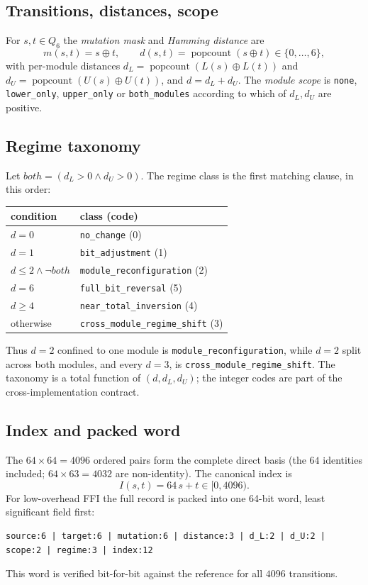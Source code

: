 \documentclass[11pt,a4paper]{article}
\begin{document}
\subsection{Transitions, distances, scope}
For $s,t\in Q_6$ the \emph{mutation mask} and \emph{Hamming distance} are
\begin{equation}
m(s,t) = s\oplus t, \qquad d(s,t) = \operatorname{popcount}(s\oplus t)\in\{0,\dots,6\},
\end{equation}
with per-module distances $d_L = \operatorname{popcount}(L(s)\oplus L(t))$ and
$d_U = \operatorname{popcount}(U(s)\oplus U(t))$, and $d = d_L + d_U$. The
\emph{module scope} is \texttt{none}, \texttt{lower\_only}, \texttt{upper\_only} or
\texttt{both\_modules} according to which of $d_L,d_U$ are positive.

\subsection{Regime taxonomy}
Let $\mathit{both} = (d_L>0 \wedge d_U>0)$. The regime class is the first matching
clause, in this order:
\begin{center}
\begin{tabular}{ll}
\toprule
condition & class (code) \\
\midrule
$d=0$ & \texttt{no\_change} (0) \\
$d=1$ & \texttt{bit\_adjustment} (1) \\
$d\le 2 \wedge \neg\mathit{both}$ & \texttt{module\_reconfiguration} (2) \\
$d=6$ & \texttt{full\_bit\_reversal} (5) \\
$d\ge 4$ & \texttt{near\_total\_inversion} (4) \\
otherwise & \texttt{cross\_module\_regime\_shift} (3) \\
\bottomrule
\end{tabular}
\end{center}
Thus $d=2$ confined to one module is \texttt{module\_reconfiguration}, while $d=2$
split across both modules, and every $d=3$, is
\texttt{cross\_module\_regime\_shift}. The taxonomy is a total function of
$(d,d_L,d_U)$; the integer codes are part of the cross-implementation contract.

\subsection{Index and packed word}
The $64\times64=4096$ ordered pairs form the complete direct basis (the $64$
identities included; $64\times63=4032$ are non-identity). The canonical index is
\begin{equation}
I(s,t) = 64\,s + t \in [0,4096).
\end{equation}
For low-overhead FFI the full record is packed into one 64-bit word, least
significant field first:
\begin{lstlisting}
source:6 | target:6 | mutation:6 | distance:3 | d_L:2 | d_U:2 | scope:2 | regime:3 | index:12
\end{lstlisting}
This word is verified bit-for-bit against the reference for all $4096$ transitions.
\end{document}
